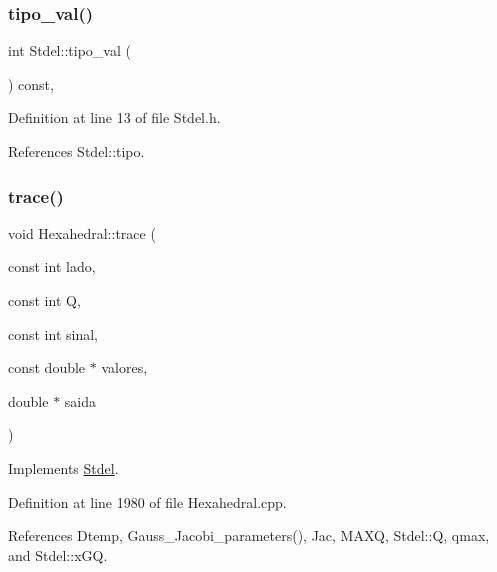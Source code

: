 \mbox{\label{classStdel_a75023fc369db2752845a9ce278f10929}} 
\subsubsection{\texorpdfstring{tipo\+\_\+val()}{tipo\_val()}}
{\footnotesize\ttfamily int Stdel\+::tipo\+\_\+val (\begin{DoxyParamCaption}{ }\end{DoxyParamCaption}) const\hspace{0.3cm}{\ttfamily [inline]}, {\ttfamily [inherited]}}



Definition at line 13 of file Stdel.\+h.



References Stdel\+::tipo.

\mbox{\label{classHexahedral_a19ff3c9bf760964284ee86ad06c795d6}} 
\subsubsection{\texorpdfstring{trace()}{trace()}}
{\footnotesize\ttfamily void Hexahedral\+::trace (\begin{DoxyParamCaption}\item[{const int}]{lado,  }\item[{const int}]{Q,  }\item[{const int}]{sinal,  }\item[{const double $\ast$}]{valores,  }\item[{double $\ast$}]{saida }\end{DoxyParamCaption})\hspace{0.3cm}{\ttfamily [virtual]}}



Implements \hyperlink{classStdel_aeb2fe03bbd8af61e503e29d3dd5ae4f0}{Stdel}.



Definition at line 1980 of file Hexahedral.\+cpp.



References Dtemp, Gauss\+\_\+\+Jacobi\+\_\+parameters(), Jac, M\+A\+XQ, Stdel\+::Q, qmax, and Stdel\+::x\+GQ.

